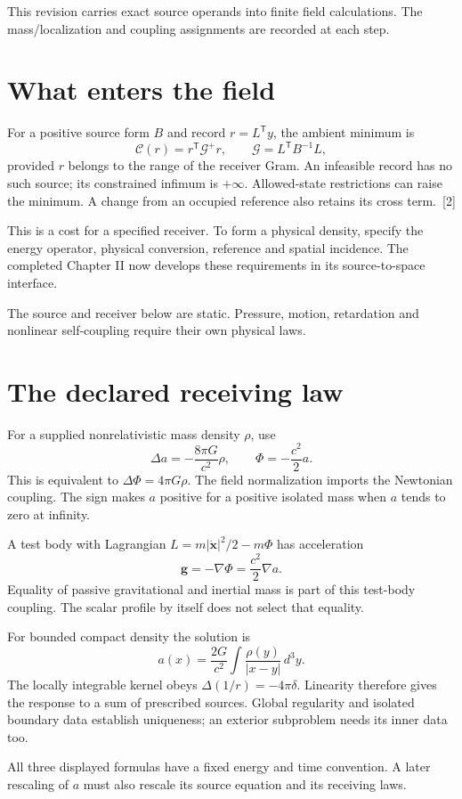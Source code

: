 \documentclass[10pt,twocolumn,letterpaper]{article}
\begin{document}
This revision carries exact source operands into finite field calculations. The mass/localization and coupling assignments are recorded at each step.

\section{What enters the field}
For a positive source form $B$ and record $r=L^{\mathsf T}y$, the ambient minimum is
\[
\mathcal C(r)=r^{\mathsf T}\mathcal G^+r,\qquad \mathcal G=L^{\mathsf T}B^{-1}L,
\]
provided $r$ belongs to the range of the receiver Gram. An infeasible record has no such source; its constrained infimum is $+\infty$. Allowed-state restrictions can raise the minimum. A change from an occupied reference also retains its cross term.~[2]

This is a cost for a specified receiver. To form a physical density, specify the energy operator, physical conversion, reference and spatial incidence. The completed Chapter II now develops these requirements in its source-to-space interface.

The source and receiver below are static. Pressure, motion, retardation and nonlinear self-coupling require their own physical laws.

\section{The declared receiving law}
For a supplied nonrelativistic mass density $\rho$, use
\[
\Delta a=-\frac{8\pi G}{c^2}\rho,\qquad \Phi=-\frac{c^2}{2}a.
\]
This is equivalent to $\Delta\Phi=4\pi G\rho$. The field normalization imports the Newtonian coupling. The sign makes $a$ positive for a positive isolated mass when $a$ tends to zero at infinity.

A test body with Lagrangian $L=m|\dot{\mathbf x}|^2/2-m\Phi$ has acceleration
\[
\mathbf g=-\nabla\Phi=\frac{c^2}{2}\nabla a.
\]
Equality of passive gravitational and inertial mass is part of this test-body coupling. The scalar profile by itself does not select that equality.

For bounded compact density the solution is
\[
a(x)=\frac{2G}{c^2}\int\frac{\rho(y)}{|x-y|}\,d^3y.
\]
The locally integrable kernel obeys $\Delta(1/r)=-4\pi\delta$. Linearity therefore gives the response to a sum of prescribed sources. Global regularity and isolated boundary data establish uniqueness; an exterior subproblem needs its inner data too.

All three displayed formulas have a fixed energy and time convention. A later rescaling of $a$ must also rescale its source equation and its receiving laws.
\end{document}
